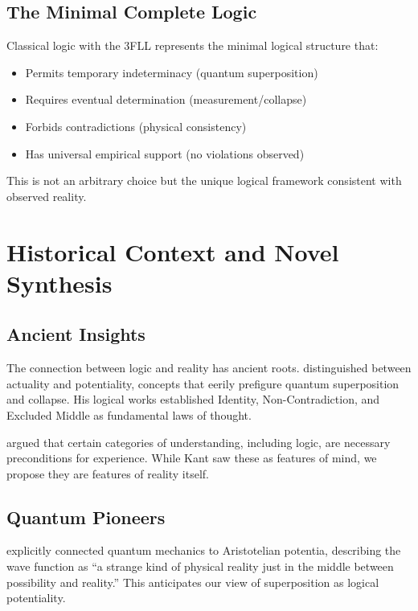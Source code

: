 \documentclass[12pt,a4paper]{article}
\begin{document}
\subsection{The Minimal Complete Logic}

Classical logic with the 3FLL represents the minimal logical structure that:
\begin{itemize}
\item Permits temporary indeterminacy (quantum superposition)
\item Requires eventual determination (measurement/collapse)
\item Forbids contradictions (physical consistency)
\item Has universal empirical support (no violations observed)
\end{itemize}

This is not an arbitrary choice but the unique logical framework consistent with observed reality.

\section{Historical Context and Novel Synthesis}

\subsection{Ancient Insights}

The connection between logic and reality has ancient roots. \citet{aristotle_metaphysics} distinguished between actuality and potentiality, concepts that eerily prefigure quantum superposition and collapse. His logical works established Identity, Non-Contradiction, and Excluded Middle as fundamental laws of thought.

\citet{kant1781critique} argued that certain categories of understanding, including logic, are necessary preconditions for experience. While Kant saw these as features of mind, we propose they are features of reality itself.

\subsection{Quantum Pioneers}

\citet{heisenberg1958physics} explicitly connected quantum mechanics to Aristotelian potentia, describing the wave function as ``a strange kind of physical reality just in the middle between possibility and reality.'' This anticipates our view of superposition as logical potentiality.
\end{document}
